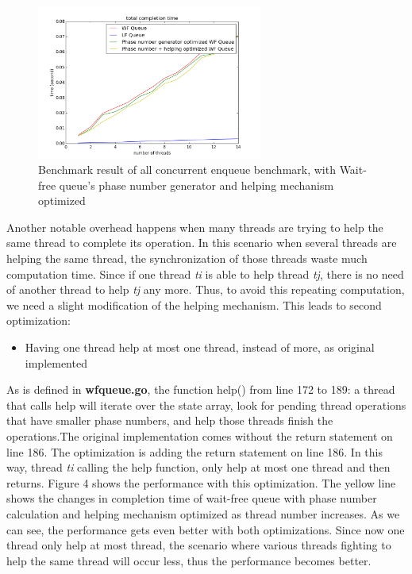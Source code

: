 \documentclass[a4paper]{article}
\begin{document}
\begin{figure}
\centering
\includegraphics[width=0.66\textwidth]{benchmark4.png}
\caption{\label{fig:benchmark4}Benchmark result of all concurrent enqueue benchmark, with Wait-free queue's phase number generator and helping mechanism optimized}
\end{figure}

Another notable overhead happens when many threads are trying to help the same thread to complete its operation. In this scenario when several threads are helping the same thread, the synchronization of those threads waste much computation time. Since if one thread \textit{ti} is able to help thread \textit{tj}, there is no need of another thread to help \textit{tj} any more. Thus, to avoid this repeating computation, we need a slight modification of the helping mechanism. This leads to second optimization:
\begin{itemize}
\item Having one thread help at most one thread, instead of more, as original implemented
\end{itemize}

As is defined in \textbf{wfqueue.go}, the function help() from line 172 to 189: a thread that calls help will iterate over the state array, look for pending thread operations that have smaller phase numbers, and help those threads finish the operations.The original implementation comes without the return statement on line 186. The optimization is adding the return statement on line 186. In this way, thread \textit{ti} calling the help function, only help at most one thread and then returns. Figure 4 shows the performance with this optimization. The yellow line shows the changes in completion time of wait-free queue with phase number calculation and helping mechanism optimized as thread number increases. As we can see, the performance gets even better with both optimizations. Since now one thread only help at most thread, the scenario where various threads fighting to help the same thread will occur less, thus the performance becomes better.
\end{document}
